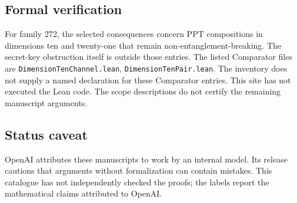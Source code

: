 \documentclass[11pt]{article}
\begin{document}
\subsection{Formal verification}
For family 272, the selected consequences concern PPT compositions in dimensions ten and twenty-one that remain non-entanglement-breaking. The secret-key obstruction itself is outside those entries. The listed Comparator files are \texttt{DimensionTenChannel.lean}, \texttt{DimensionTenPair.lean}. The inventory does not supply a named declaration for these Comparator entries. This site has not executed the Lean code. The scope descriptions do not certify the remaining manuscript arguments.

\subsection{Status caveat}
OpenAI attributes these manuscripts to work by an internal model. Its release cautions that arguments without formalization can contain mistakes. This catalogue has not independently checked the proofs; the labels report the mathematical claims attributed to OpenAI.
\end{document}
